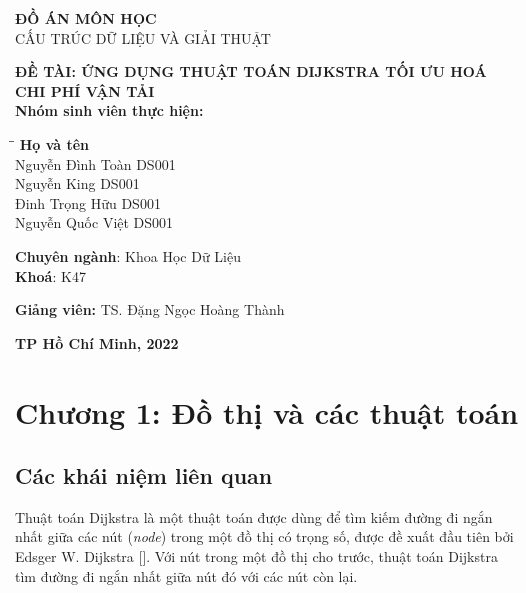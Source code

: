 \documentclass[a4paper]{article}
\begin{document}
\begin{titlepage}
\begin{center}
    \vspace{20pt}
    \fontsize{14pt}{13pt}\selectfont 
    \textbf{ĐỒ ÁN MÔN HỌC}\\ 
    \vspace{5pt}
    CẤU TRÚC DỮ LIỆU VÀ GIẢI THUẬT\\
    \vspace{7pt}
\end{center}
\vspace{2cm}
\large
\textbf{ĐỀ TÀI: ỨNG DỤNG THUẬT TOÁN DIJKSTRA TỐI ƯU HOÁ CHI PHÍ VẬN TẢI}\\
\vspace{3pt}
\textbf{\large{Nhóm sinh viên thực hiện:}}
\begin{tabbing}
\hspace{8cm}\=\hspace{6cm}\=\hspace{6cm} \kill
{\textbf{Họ và tên}}\\
Nguyễn Đình Toàn  \> DS001\\
Nguyễn King  \> DS001\\
Đinh Trọng Hữu  \> DS001\\
Nguyễn Quốc Việt  \> DS001\\
\end{tabbing}
\begin{center}
\textbf{Chuyên ngành}: Khoa Học Dữ Liệu\\
\textbf{Khoá}: K47
\end{center}

\vspace{2cm}
\large
\begin{center}
    \textbf{Giảng viên:} TS. Đặng Ngọc Hoàng Thành
\end{center}
\vfill
\large
\begin{center}
    \textbf{TP Hồ Chí Minh, 2022}
\end{center}
\end{titlepage}

\large
\tableofcontents
\vfill
\pagebreak
\section{Chương 1: Đồ thị và các thuật toán}
\subsection{Các khái niệm liên quan}
Thuật toán Dijkstra là một thuật toán được dùng để tìm kiếm đường đi ngắn nhất giữa các nút (\textit{node}) trong một đồ thị có trọng số, được đề xuất đầu tiên bởi Edsger W. Dijkstra [\cite{dijkstra2022note,frana2010interview}]. Với nút trong một đồ thị cho trước, thuật toán Dijkstra tìm đường đi ngắn nhất giữa nút đó với các nút còn lại.\\
\end{document}

